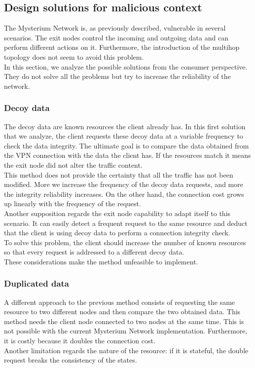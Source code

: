 \documentclass[12pt]{article}
\begin{document}
	\subsection{Design solutions for malicious context}

		The Mysterium Network is, as previously described, vulnerable in several scenarios. The exit nodes control the incoming and outgoing data and can perform different actions on it. Furthermore, the introduction of the multihop topology does not seem to avoid this problem.\\
		\bigbreak
		In this section, we analyze the possible solutions from the consumer perspective. They do not solve all the problems but try to increase the reliability of the network.\\

		\subsubsection{Decoy data}
		The decoy data are known resources the client already has.
		In this first solution that we analyze, the client requests these decoy data at a variable frequency to check the data integrity. The ultimate goal is to compare the data obtained from the VPN connection with the data the client has. If the resources match it means the exit node did not alter the traffic content.\\
		\bigbreak
		This method does not provide the certainty that all the traffic has not been modified. More we increase the frequency of the decoy data requests, and more the integrity reliability increases. On the other hand, the connection cost grows up linearly with the frequency of the request.\\
		Another supposition regards the exit node capability to adapt itself to this scenario. It can easily detect a frequent request to the same resource and deduct that the client is using decoy data to perform a connection integrity check.\\To solve this problem, the client should increase the number of known resources so that every request is addressed to a different decoy data.\\
		These considerations make the method unfeasible to implement.

		\subsubsection{Duplicated data}
		A different approach to the previous method consists of requesting the same resource to two different nodes and then compare the two obtained data. This method needs the client node connected to two nodes at the same time. This is not possible with the current Mysterium Network implementation. Furthermore, it is costly because it doubles the connection cost.\\
		Another limitation regards the nature of the resource: if it is stateful, the double request breaks the consistency of the states.
		 
\end{document}

